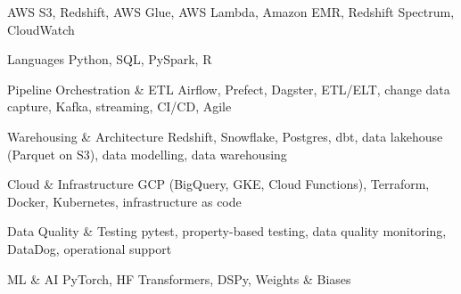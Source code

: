 
\begin{cvskills}

  \cvskill
    {AWS}
    {S3, Redshift, AWS Glue, AWS Lambda, Amazon EMR, Redshift Spectrum, CloudWatch}

  \cvskill
    {Languages}
    {Python, SQL, PySpark, R}

  \cvskill
    {Pipeline Orchestration \& ETL}
    {Airflow, Prefect, Dagster, ETL/ELT, change data capture, Kafka, streaming, CI/CD, Agile}

  \cvskill
    {Warehousing \& Architecture}
    {Redshift, Snowflake, Postgres, dbt, data lakehouse (Parquet on S3), data modelling, data warehousing}

  \cvskill
    {Cloud \& Infrastructure}
    {GCP (BigQuery, GKE, Cloud Functions), Terraform, Docker, Kubernetes, infrastructure as code}

  \cvskill
    {Data Quality \& Testing}
    {pytest, property-based testing, data quality monitoring, DataDog, operational support}

  \cvskill
    {ML \& AI}
    {PyTorch, HF Transformers, DSPy, Weights \& Biases}

\end{cvskills}
